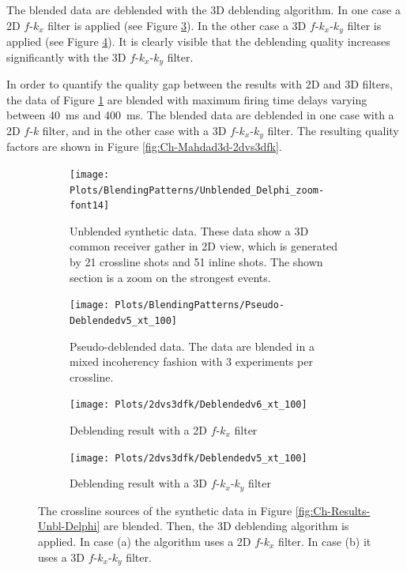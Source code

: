 The blended data are deblended with the 3D deblending algorithm. In one case a 2D $f$-$k_x$ filter is applied (see Figure \ref{fig:Ch-Mahdad3d-Deblending-2dfk}). In the other case a 3D $f$-$k_x$-$k_y$ filter is applied (see Figure \ref{fig:Ch-Mahdad3d-Deblending-3dfk}). It is clearly visible that the deblending quality increases significantly with the 3D $f$-$k_x$-$k_y$ filter.

In order to quantify the quality gap between the results with 2D and 3D filters, the data of Figure \ref{fig:Ch-Mahdad3d-Unbl-Delphi} are blended with maximum firing time delays varying between \SI{40}{\milli\second} and \SI{400}{\milli\second}. The blended data are deblended in one case with a 2D $f$-$k$ filter, and in the other case with a 3D $f$-$k_x$-$k_y$ filter. The resulting quality factors are shown in Figure \ref{fig:Ch-Mahdad3d-2dvs3dfk}.

 
\begin{figure}
	
	\centering
	\begin{subfigure}[t]{0.8\textwidth}
		\centering
		\texttt{[image: Plots/BlendingPatterns/Unblended\_Delphi\_zoom-font14]}
		\caption{Unblended synthetic data. These data show a 3D common receiver gather in 2D view, which is generated by 21 crossline shots and 51 inline shots. The shown section is a zoom on the strongest events.}
		\label{fig:Ch-Mahdad3d-Unbl-Delphi}
	\end{subfigure}

	\par\bigskip
	
	\centering
	\begin{subfigure}[t]{0.8\textwidth}
		\texttt{[image: Plots/BlendingPatterns/Pseudo-Deblendedv5\_xt\_100]}
		\caption{Pseudo-deblended data. The data are blended in a mixed incoherency fashion with 3 experiments per crossline.}
		\label{fig:Ch-Mahdad3d-Deblending-Pseudo-Zoom}
	\end{subfigure}
	
	\par\bigskip

	\centering
	\begin{subfigure}[t]{0.8\textwidth}
		\texttt{[image: Plots/2dvs3dfk/Deblendedv6\_xt\_100]}
		\caption{Deblending result with a 2D $f$-$k_x$ filter}
		\label{fig:Ch-Mahdad3d-Deblending-2dfk}
	\end{subfigure}
	
	\par\bigskip
	
	\centering
	\begin{subfigure}[t]{0.8\textwidth}
		\texttt{[image: Plots/2dvs3dfk/Deblendedv5\_xt\_100]}
		\caption{Deblending result with a 3D $f$-$k_x$-$k_y$ filter}
		\label{fig:Ch-Mahdad3d-Deblending-3dfk}
	\end{subfigure}
	
	\caption{The crossline sources of the synthetic data in Figure \ref{fig:Ch-Results-Unbl-Delphi} are blended. Then, the 3D deblending algorithm is applied. In case (a) the algorithm uses a 2D $f$-$k_x$ filter. In case (b) it uses a 3D $f$-$k_x$-$k_y$ filter.}
	\label{fig:Ch-Mahdad3d-Deblending-2dvs3d-fk}
	
\end{figure}


